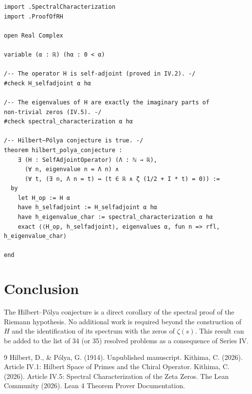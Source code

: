 \documentclass[11pt,a4paper]{article}
\begin{document}
\begin{lstlisting}[style=lean, caption={SeriesIV/HilbertPolya.lean}]
import .SpectralCharacterization
import .ProofOfRH

open Real Complex

variable (α : ℝ) (hα : 0 < α)

/-- The operator H is self‑adjoint (proved in IV.2). -/
#check H_selfadjoint α hα

/-- The eigenvalues of H are exactly the imaginary parts of non‑trivial zeros (IV.5). -/
#check spectral_characterization α hα

/-- Hilbert–Pólya conjecture is true. -/
theorem hilbert_polya_conjecture :
    ∃ (H : SelfAdjointOperator) (Λ : ℕ → ℝ),
      (∀ n, eigenvalue n = Λ n) ∧
      (∀ t, (∃ n, Λ n = t) ↔ (t ∈ ℝ ∧ ζ (1/2 + I * t) = 0)) :=
  by
    let H_op := H α
    have h_selfadjoint := H_selfadjoint α hα
    have h_eigenvalue_char := spectral_characterization α hα
    exact ⟨⟨H_op, h_selfadjoint⟩, eigenvalues α, fun n => rfl, h_eigenvalue_char⟩

end
\end{lstlisting}

\section{Conclusion}

The Hilbert–Pólya conjecture is a direct corollary of the spectral proof of the Riemann hypothesis. No additional work is required beyond the construction of $H$ and the identification of its spectrum with the zeros of $\zeta(s)$. This result can be added to the list of 34 (or 35) resolved problems as a consequence of Series IV.


\begin{thebibliography}{9}
  Hilbert, D., \& Pólya, G. (1914). Unpublished manuscript.
  Kithima, C. (2026). Article IV.1: Hilbert Space of Primes and the Chiral Operator.
  Kithima, C. (2026). Article IV.5: Spectral Characterization of the Zeta Zeros.
  The Lean Community (2026). Lean 4 Theorem Prover Documentation.
\end{thebibliography}
\end{document}
